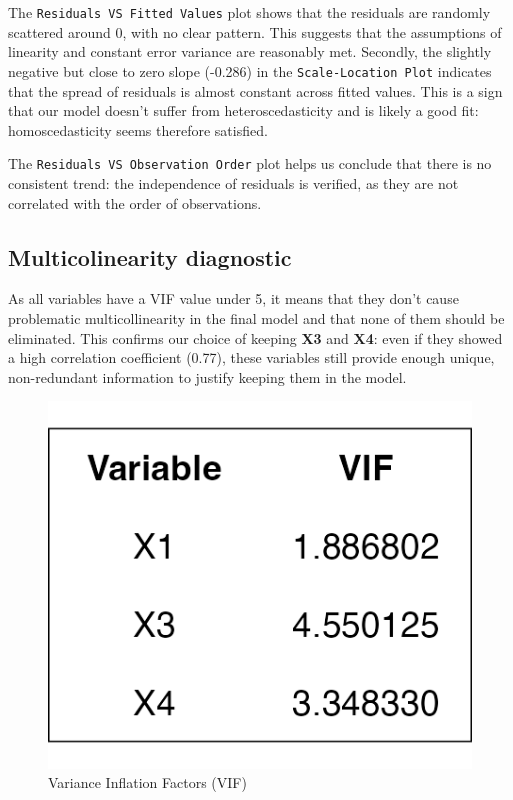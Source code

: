 \documentclass[
  11pt,
]{article}
\begin{document}
The \texttt{Residuals\ VS\ Fitted\ Values} plot shows that the residuals
are randomly scattered around 0, with no clear pattern. This suggests
that the assumptions of linearity and constant error variance are
reasonably met. Secondly, the slightly negative but close to zero slope
(-0.286) in the \texttt{Scale-Location\ Plot} indicates that the spread
of residuals is almost constant across fitted values. This is a sign
that our model doesn't suffer from heteroscedasticity and is likely a
good fit: homoscedasticity seems therefore satisfied.

The \texttt{Residuals\ VS\ Observation\ Order} plot helps us conclude
that there is no consistent trend: the independence of residuals is
verified, as they are not correlated with the order of observations.

\vspace{-0.5em}

\subsection{Multicolinearity
diagnostic}\label{multicolinearity-diagnostic}

\noindent

\begin{minipage}{0.75\textwidth}
\vspace{-0.5em}
As all variables have a VIF value under 5, it means that they don’t cause problematic multicollinearity in the final model and that none of them should be eliminated. This confirms our choice of keeping \textbf{X3} and \textbf{X4}: even if they showed a high correlation coefficient (0.77), these variables still provide enough unique, non-redundant information to justify keeping them in the model.
\end{minipage}
\hfill
\begin{minipage}{0.2\textwidth}
\vspace{-3em}
  \begin{figure}[H]
    \centering
    \includegraphics[width=0.8\linewidth]{vif_table.png}
    \vspace{-0.5em}
    \caption{\tiny Variance Inflation Factors (VIF)}
  \end{figure}
\end{minipage}
\end{document}
